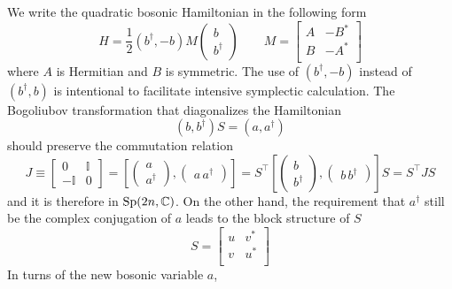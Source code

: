 
We write the quadratic bosonic Hamiltonian in the following form
\begin{equation}
H = \frac{1}{2} (b^{\dagger}, -b)
M 
\begin{pmatrix}
b\\
b^{\dagger} 
\end{pmatrix} \qquad 
M = 
\begin{bmatrix}
A & -B^* \\
B & -A^* \\
\end{bmatrix}
\end{equation}
where $A$ is Hermitian and $B$ is symmetric. The use of $(b^{\dagger}, -b)$ instead of $(b^{\dagger}, b)$ is intentional to facilitate intensive symplectic calculation. The Bogoliubov transformation that diagonalizes the Hamiltonian
\begin{equation}
(b, b^{\dagger}) S = ( a, a^{\dagger} ) 
\end{equation}
should preserve the commutation relation
\begin{equation}
J \equiv \begin{bmatrix}
0 & \mathbb{I}\\
-\mathbb{I} & 0 
\end{bmatrix} =  
[
\begin{pmatrix}
a \\
a^{\dagger} 
\end{pmatrix}, 
\begin{pmatrix}
a \, a^{\dagger}
\end{pmatrix}]
=
S^{\top}
[
\begin{pmatrix}
b \\
b^{\dagger} 
\end{pmatrix}, 
\begin{pmatrix}
b \, b^{\dagger}
\end{pmatrix}]S
 = S^{\top} J S 
\end{equation}
and it is therefore in ${\rm Sp}( 2n, \mathbb{C} ) $. On the other hand, the requirement that $a^{\dagger}$ still be the complex conjugation of $a$ leads to the block structure of $S$
\begin{equation}
S = 
\begin{bmatrix}
u & v^*\\
v & u^*\\    
\end{bmatrix}
\end{equation}
In turns of the new bosonic variable $a$,
